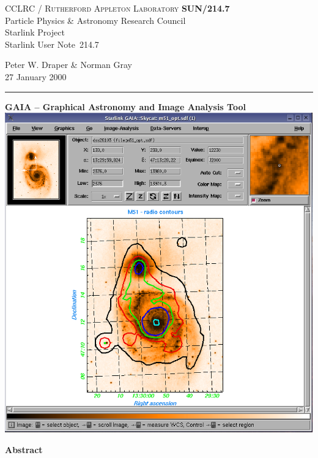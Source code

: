 \documentclass[twoside,11pt]{article}
\newcommand{\stardoccategory}  {Starlink User Note}
\newcommand{\stardocinitials}  {SUN}
\newcommand{\stardocnumber}    {214.7}
\newcommand{\stardocauthors}   {Peter W. Draper \& Norman Gray}
\newcommand{\stardocdate}      {27 January 2000}
\newcommand{\stardoctitle}     {GAIA -- Graphical Astronomy and
                                Image Analysis Tool}
\newcommand{\stardocname}{\stardocinitials /\stardocnumber}
\newenvironment{latexonly}{}{}
\renewcommand{\_}{\texttt{\symbol{95}}}
\begin{document}
\thispagestyle{empty}

\begin{latexonly}
   CCLRC / \textsc{Rutherford Appleton Laboratory} \hfill \textbf{\stardocname}\\
   {\large Particle Physics \& Astronomy Research Council}\\
   {\large Starlink Project\\}
   {\large \stardoccategory\ \stardocnumber}
   \begin{flushright}
   \stardocauthors\\
   \stardocdate
   \end{flushright}
   \vspace{-4mm}
   \rule{\textwidth}{0.5mm}
   \vspace{5mm}
   \begin{center}
   {\Large\textbf{\stardoctitle \\ [2.5ex]}}
   \vspace{5mm}
   \includegraphics[totalheight=5in]{sun214fig.ps}
   \end{center}

   \begin{center}
      {\Large\textbf{Abstract}}
   \end{center}
\end{latexonly}
\end{document}
